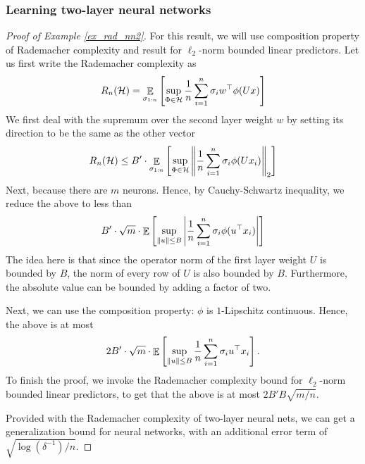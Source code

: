 \subsubsection{Learning two-layer neural networks}

\begin{proof}[Proof of Example \ref{ex_rad_nn2}]
For this result, we will use composition property of Rademacher complexity and result for $\ell_2$-norm bounded linear predictors.
Let us first write the Rademacher complexity as
\begin{align*}
    R_n(\mathcal{H}) = \mathop{\mathbb{E}}_{\sigma_{1:n}}\left[  \sup_{\Phi\in\mathcal{H}} \frac 1 n \sum_{i=1}^n \sigma_i w^{\top} \phi(Ux)  \right]
\end{align*}
We first deal with the supremum over the second layer weight $w$ by setting its direction to be the same as the other vector
\[ R_n(\mathcal{H}) \le B' \cdot \mathop{\mathbb{E}}_{\sigma_{1:n}}\left[  \sup_{\Phi\in\mathcal{H}} \left\| \frac 1 n \sum_{i=1}^n \sigma_i \phi(Ux_i)  \right\|_{2}  \right] \]
Next, because there are $m$ neurons. Hence, by Cauchy-Schwartz inequality, we reduce the above to less than
\[ B' \cdot \sqrt m \cdot \mathop{\mathbb{E}}\left[  \sup_{\left\| u \right\| \le B} {\left| { \frac 1 n \sum_{i=1}^n \sigma_i \phi(u^{\top} x_i)} \right|}  \right] \]
The idea here is that since the operator norm of the first layer weight $U$ is bounded by $B$, the norm of every row of $U$ is also bounded by $B$.
Furthermore, the absolute value can be bounded by adding a factor of two.

Next, we can use the composition property: $\phi$ is $1$-Lipschitz continuous.
Hence, the above is at most
\[ 2B' \cdot \sqrt m \cdot \mathop{\mathbb{E}}\left[  \sup_{\left\| u \right\| \le B} { \frac 1 n \sum_{i=1}^n \sigma_i u^{\top} x_i}  \right]. \]
To finish the proof, we invoke the Rademacher complexity bound for $\ell_2$-norm bounded linear predictors, to get that the above is at most $2B' B \sqrt{m / n}$.

Provided with the Rademacher complexity of two-layer neural nets, we can get a generalization bound for neural networks, with an additional error term of $\sqrt{\log(\delta^{-1})/n}$.
\end{proof}

